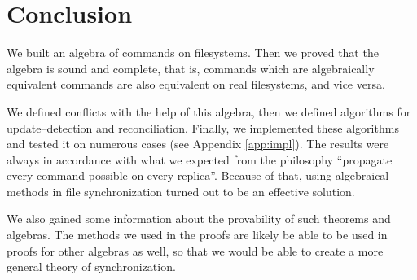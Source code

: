 \section{Conclusion}

We built an algebra of commands on filesystems. Then we proved that the
algebra is sound and complete, that is, commands which are algebraically
equivalent commands are also equivalent on real filesystems, and vice
versa.

We defined conflicts with the help of this algebra, then we defined
algorithms for update--detection and reconciliation. Finally, we
implemented these algorithms and tested it on numerous cases (see
Appendix \ref{app:impl}). The results were always in accordance with what
we expected from the philosophy ``propagate every command possible on
every replica''.  Because of that, using algebraical methods in file
synchronization turned out to be an effective solution.

We also gained some information about the provability of such theorems and
algebras. The methods we used in the proofs are likely be able to be used
in proofs for other algebras as well, so that we would be able to create a
more general theory of synchronization.


